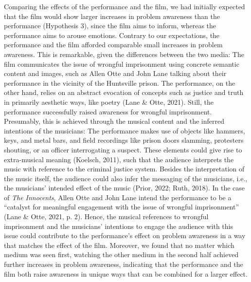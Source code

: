 \documentclass[
  man,floatsintext]{apa6}
\begin{document}
Comparing the effects of the performance and the film, we had initially expected that the film would show larger increases in problem awareness than the performance (Hypothesis 3), since the film aims to inform, whereas the performance aims to arouse emotions. Contrary to our expectations, the performance and the film afforded comparable small increases in problem awareness. This is remarkable, given the differences between the two media: The film communicates the issue of wrongful imprisonment using concrete semantic content and images, such as Allen Otte and John Lane talking about their performance in the vicinity of the Huntsville prison. The performance, on the other hand, relies on an abstract evocation of concepts such as justice and truth in primarily aesthetic ways, like poetry (Lane \& Otte, 2021). Still, the performance successfully raised awareness for wrongful imprisonment. Presumably, this is achieved through the musical content and the inferred intentions of the musicians: The performance makes use of objects like hammers, keys, and metal bars, and field recordings like prison doors slamming, protesters shouting, or an officer interrogating a suspect. These elements could give rise to extra-musical meaning (Koelsch, 2011), such that the audience interprets the music with reference to the criminal justice system. Besides the interpretation of the music itself, the audience could also infer the messaging of the musicians, i.e., the musicians' intended effect of the music (Prior, 2022; Ruth, 2018). In the case of \textit{The Innocents}, Allen Otte and John Lane intend the performance to be a ``catalyst for meaningful engagement with the issue of wrongful imprisonment'' (Lane \& Otte, 2021, p. 2). Hence, the musical references to wrongful imprisonment and the musicians' intentions to engage the audience with this issue could contribute to the performance's effect on problem awareness in a way that matches the effect of the film. Moreover, we found that no matter which medium was seen first, watching the other medium in the second half achieved further increases in problem awareness, indicating that the performance and the film both raise awareness in unique ways that can be combined for a larger effect.
\end{document}
